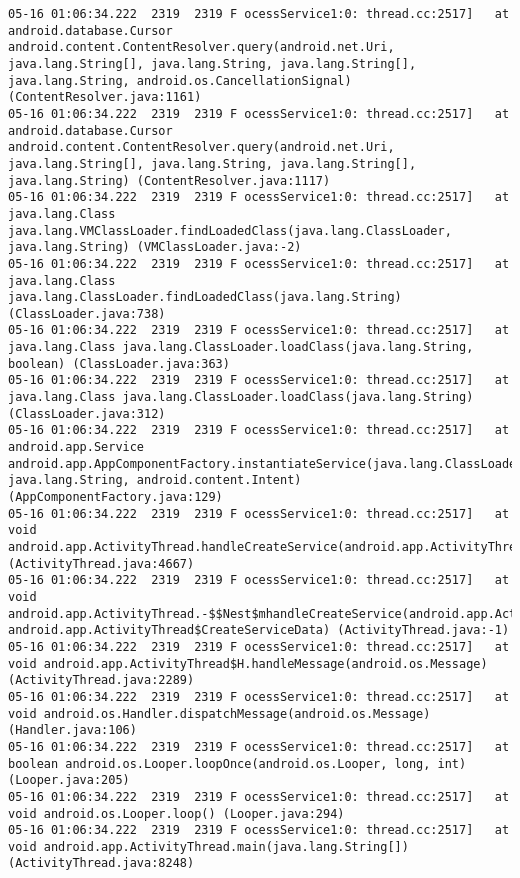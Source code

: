 \begin{lstlisting}
05-16 01:06:34.222  2319  2319 F ocessService1:0: thread.cc:2517]   at android.database.Cursor android.content.ContentResolver.query(android.net.Uri, java.lang.String[], java.lang.String, java.lang.String[], java.lang.String, android.os.CancellationSignal) (ContentResolver.java:1161)
05-16 01:06:34.222  2319  2319 F ocessService1:0: thread.cc:2517]   at android.database.Cursor android.content.ContentResolver.query(android.net.Uri, java.lang.String[], java.lang.String, java.lang.String[], java.lang.String) (ContentResolver.java:1117)
05-16 01:06:34.222  2319  2319 F ocessService1:0: thread.cc:2517]   at java.lang.Class java.lang.VMClassLoader.findLoadedClass(java.lang.ClassLoader, java.lang.String) (VMClassLoader.java:-2)
05-16 01:06:34.222  2319  2319 F ocessService1:0: thread.cc:2517]   at java.lang.Class java.lang.ClassLoader.findLoadedClass(java.lang.String) (ClassLoader.java:738)
05-16 01:06:34.222  2319  2319 F ocessService1:0: thread.cc:2517]   at java.lang.Class java.lang.ClassLoader.loadClass(java.lang.String, boolean) (ClassLoader.java:363)
05-16 01:06:34.222  2319  2319 F ocessService1:0: thread.cc:2517]   at java.lang.Class java.lang.ClassLoader.loadClass(java.lang.String) (ClassLoader.java:312)
05-16 01:06:34.222  2319  2319 F ocessService1:0: thread.cc:2517]   at android.app.Service android.app.AppComponentFactory.instantiateService(java.lang.ClassLoader, java.lang.String, android.content.Intent) (AppComponentFactory.java:129)
05-16 01:06:34.222  2319  2319 F ocessService1:0: thread.cc:2517]   at void android.app.ActivityThread.handleCreateService(android.app.ActivityThread$CreateServiceData) (ActivityThread.java:4667)
05-16 01:06:34.222  2319  2319 F ocessService1:0: thread.cc:2517]   at void android.app.ActivityThread.-$$Nest$mhandleCreateService(android.app.ActivityThread, android.app.ActivityThread$CreateServiceData) (ActivityThread.java:-1)
05-16 01:06:34.222  2319  2319 F ocessService1:0: thread.cc:2517]   at void android.app.ActivityThread$H.handleMessage(android.os.Message) (ActivityThread.java:2289)
05-16 01:06:34.222  2319  2319 F ocessService1:0: thread.cc:2517]   at void android.os.Handler.dispatchMessage(android.os.Message) (Handler.java:106)
05-16 01:06:34.222  2319  2319 F ocessService1:0: thread.cc:2517]   at boolean android.os.Looper.loopOnce(android.os.Looper, long, int) (Looper.java:205)
05-16 01:06:34.222  2319  2319 F ocessService1:0: thread.cc:2517]   at void android.os.Looper.loop() (Looper.java:294)
05-16 01:06:34.222  2319  2319 F ocessService1:0: thread.cc:2517]   at void android.app.ActivityThread.main(java.lang.String[]) (ActivityThread.java:8248)

\end{lstlisting}
